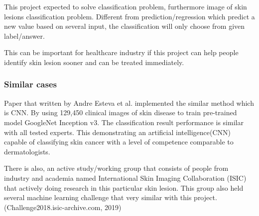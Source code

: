 \documentclass[11pt]{article}
\begin{document}
This project expected to solve classification problem, furthermore image
of skin lesions classification problem. Different from
prediction/regression which predict a new value based on several input,
the classification will only choose from given label/answer.

This can be important for healthcare industry if this project can help
people identify skin lesion sooner and can be treated immediately.

    \subsubsection{Similar cases}\label{similar-cases}

Paper that written by Andre Esteva et al. implemented the similar method
which is CNN. By using 129,450 clinical images of skin disease to train
pre-trained model GoogleNet Inception v3. The classification result
performance is similar with all tested experts. This demonstrating an
artificial intelligence(CNN) capable of classifying skin cancer with a
level of competence comparable to dermatologists.

There is also, an active study/working group that consists of people
from industry and academia named International Skin Imaging
Collaboration (ISIC) that actively doing research in this particular
skin lesion. This group also held several machine learning challenge
that very similar with this project. (Challenge2018.isic-archive.com,
2019)
\end{document}
